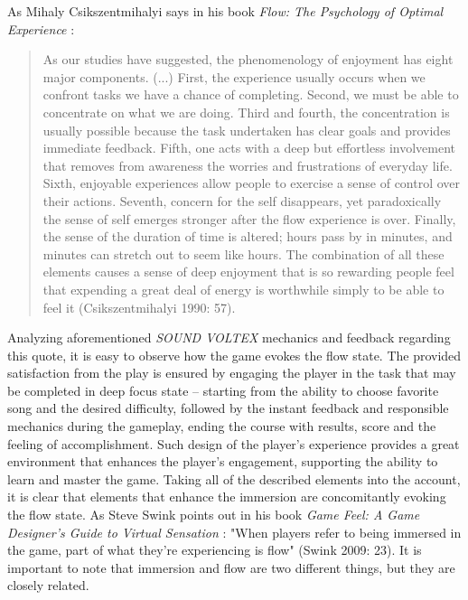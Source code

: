 As Mihaly Csikszentmihalyi says in his book \textit{Flow: The Psychology of Optimal Experience} \cite{csikszentmihalyi1990flow}:
\begin{quote}
    As our studies have suggested, the phenomenology of enjoyment has eight major components. (...) First, the experience usually occurs when we confront tasks we have a chance of completing. Second, we must be able to concentrate on what we are doing. Third and fourth, the concentration is usually possible because the task undertaken has clear goals and provides immediate feedback. Fifth, one acts with a deep but effortless involvement that removes from awareness the worries and frustrations of everyday life. Sixth, enjoyable experiences allow people to exercise a sense of control over their actions. Seventh, concern for the self disappears, yet paradoxically the sense of self emerges stronger after the flow experience is over. Finally, the sense of the duration of time is altered; hours pass by in minutes, and minutes can stretch out to seem like hours. The combination of all these elements causes a sense of deep enjoyment that is so rewarding people feel that expending a great deal of energy is worthwhile simply to be able to feel it (Csikszentmihalyi 1990: 57).
\end{quote}

Analyzing aforementioned \textit{SOUND VOLTEX} mechanics and feedback regarding this quote, it is easy to observe how the game evokes the flow state. The provided satisfaction from the play is ensured by engaging the player in the task that may be completed in deep focus state -- starting from the ability to choose favorite song and the desired difficulty, followed by the instant feedback and responsible mechanics during the gameplay, ending the course with results, score and the feeling of accomplishment. Such design of the player’s experience provides a great environment that enhances the player’s engagement, supporting the ability to learn and master the game. Taking all of the described elements into the account, it is clear that elements that enhance the immersion are concomitantly evoking the flow state. As Steve Swink points out in his book \textit{Game Feel: A Game Designer’s Guide to Virtual Sensation} \cite{gamefeel}: "When players refer to being immersed in the game, part of what they’re experiencing is flow" (Swink 2009: 23). It is important to note that immersion and flow are two different things, but they are closely related.

